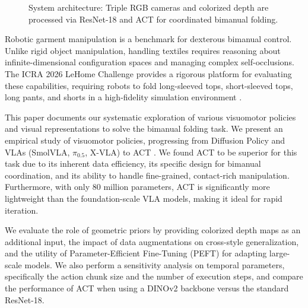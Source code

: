 \begin{figure}[t]
{
    }
    \caption{System architecture: Triple RGB cameras and colorized depth are processed via ResNet-18 and ACT for coordinated bimanual folding.}
    \label{fig:system_diagram}
\end{figure}

Robotic garment manipulation is a benchmark for dexterous bimanual control. Unlike rigid object manipulation, handling textiles requires reasoning about infinite-dimensional configuration spaces and managing complex self-occlusions. The ICRA 2026 LeHome Challenge \cite{lehome2026} provides a rigorous platform for evaluating these capabilities, requiring robots to fold long-sleeved tops, short-sleeved tops, long pants, and shorts in a high-fidelity simulation environment \cite{mittal2023orbit}.

This paper documents our systematic exploration of various visuomotor policies and visual representations to solve the bimanual folding task. We present an empirical study of visuomotor policies, progressing from Diffusion Policy \cite{chi2023diffusionpolicy} and VLAs (SmolVLA, $\pi_{0.5}$, X-VLA) to ACT \cite{zhao2023act}. We found ACT to be superior for this task due to its inherent data efficiency, its specific design for bimanual coordination, and its ability to handle fine-grained, contact-rich manipulation. Furthermore, with only 80 million parameters, ACT is significantly more lightweight than the foundation-scale VLA models, making it ideal for rapid iteration.

We evaluate the role of geometric priors by providing colorized depth maps as an additional input, the impact of data augmentations on cross-style generalization, and the utility of Parameter-Efficient Fine-Tuning (PEFT) for adapting large-scale models. We also perform a sensitivity analysis on temporal parameters, specifically the action chunk size and the number of execution steps, and compare the performance of ACT when using a DINOv2 backbone versus the standard ResNet-18.

